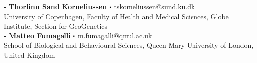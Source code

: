 \documentclass[letterpaper,10.5pt]{article}
\newcommand\sbullet[1][.5]{\mathbin{\vcenter{\hbox{\scalebox{#1}{$\bullet$}}}}}
\begin{document}
\textbf{-} \textbf{\href{https://scholar.google.com/citations?hl=en&user=-YNWF4AAAAAJ}{Thorfinn Sand Korneliussen}}   $\sbullet[.5]$ tskorneliussen@sund.ku.dk \\
University of Copenhagen, Faculty of Health and Medical Sciences, Globe Institute, Section for GeoGenetics \\

\textbf{-} \textbf{\href{https://scholar.google.com/citations?hl=en&user=rQhiTmYAAAAJ}{Matteo Fumagalli}}   $\sbullet[.5]$  m.fumagalli@qmul.ac.uk  \\
School of Biological and Behavioural Sciences, Queen Mary University of London, United Kingdom \\
\end{document}
